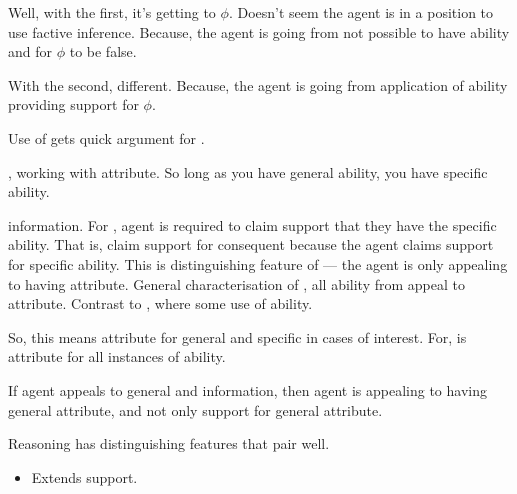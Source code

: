 \newpage

\begin{note}
    {
    \color{green}
    Well, with the first, it's getting to \(\phi\).
    Doesn't seem the agent is in a position to use factive inference.
    Because, the agent is going from not possible to have ability and for \(\phi\) to be false.

    With the second, different.
    Because, the agent is going from application of ability providing support for \(\phi\).
  }

  Use of \AR{} gets quick argument for \RBV{}.
\end{note}

\begin{note}[Application of \nI{} to \AR{}]
  \AR{}, working with attribute.
  So long as you have general ability, you have specific ability.
\end{note}

\newpage

\begin{note}
  \gsi{} information.
  For \AR{}, agent is required to claim support that they have the specific ability.
  That is, claim support for consequent because the agent claims support for specific ability.
  This is distinguishing feature of \AR{} --- the agent is only appealing to having attribute.
  General characterisation of \AR{}, all ability from appeal to attribute.
  Contrast to \WR{}, where some use of ability.

  So, this means attribute for general and specific in cases of interest.
  For, \AR{} is attribute for all instances of ability.




    If agent appeals to general and information, then agent is appealing to having general attribute, and not only support for general attribute.
\end{note}

\newpage

\begin{note}
  Reasoning has distinguishing features that pair well.
  \begin{itemize}
  \item Extends support.
  \end{itemize}
\end{note}


